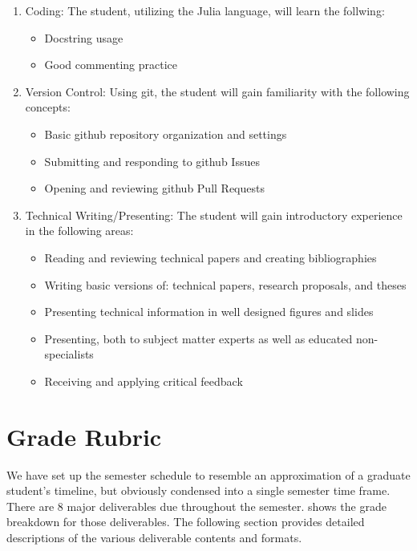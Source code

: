 \documentclass[12pt]{article}
\begin{document}
\begin{enumerate}
	\item Coding: The student, utilizing the Julia language, will learn the follwing:
	\begin{itemize}
		\item Docstring usage
		\item Good commenting practice
	\end{itemize}
	\item Version Control: Using git, the student will gain familiarity with the following concepts:
	\begin{itemize}
		\item Basic github repository organization and settings
		\item Submitting and responding to github Issues
		\item Opening and reviewing github Pull Requests
	\end{itemize}
	\item Technical Writing/Presenting: The student will gain introductory experience in the following areas:
	\begin{itemize}
		\item Reading and reviewing technical papers and creating bibliographies
		\item Writing basic versions of: technical papers, research proposals, and theses
		\item Presenting technical information in well designed figures and slides
		\item Presenting, both to subject matter experts as well as educated non-specialists
		\item Receiving and applying critical feedback
	\end{itemize}
\end{enumerate}





\section{Grade Rubric}
\label{sec:graderubric}

We have set up the semester schedule to resemble an approximation of a graduate student's timeline, but obviously condensed into a single semester time frame.
There are 8 major deliverables due throughout the semester.
 shows the grade breakdown for those deliverables.
The following section provides detailed descriptions of the various deliverable contents and formats.
\end{document}

